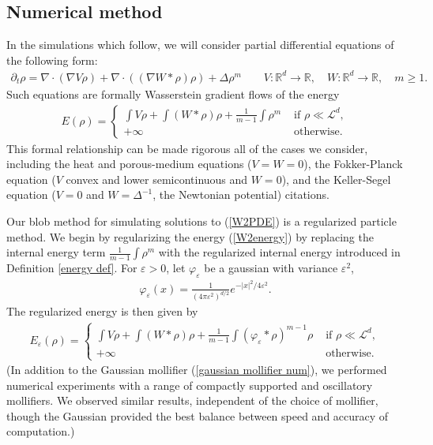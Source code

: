 \documentclass[11pt,leqno]{amsart}
\theoremstyle{definition}
\newcommand{\R}{{\mathord{\mathbb R}}}
\newcommand{\Rd}{{\mathord{\mathbb R}^d}}
\def\epsilon{\varepsilon}
\def\e{\varepsilon}
\begin{document}
\subsection{Numerical method} \label{numericalmethod}
In the simulations which follow, we will consider partial differential equations of the following form:
\begin{align} \label{W2PDE}
\partial_t \rho = \nabla \cdot (\nabla V \rho) + \nabla \cdot ((\nabla W*\rho) \rho) + \Delta \rho^m \qquad V: \Rd \to \R, \quad W: \Rd \to \R , \quad m \geq 1 .
\end{align}
Such equations are formally Wasserstein gradient flows of the energy
\begin{align} \label{W2energy}
E(\rho) = \begin{cases}
 \int V \rho + \int (W*\rho) \rho + \frac{1}{m-1} \int \rho^m &\text{ if } \rho \ll \mathcal{L}^d ,\\ +\infty &\text{ otherwise.}
 \end{cases}
\end{align}
This formal relationship can be made rigorous all of the cases we consider, including the heat and porous-medium equations ($V = W =0$), the Fokker-Planck equation ($V$ convex and lower semicontinuous and $W=0$), and the Keller-Segel equation ($V = 0$ and $W = \Delta^{-1}$, the Newtonian potential) {\color{Aquamarine} citations}.

Our blob method for simulating solutions to (\ref{W2PDE}) is a regularized particle method. We begin by regularizing the energy (\ref{W2energy}) by replacing the internal energy term $\frac{1}{m-1} \int \rho^m$ with the regularized internal energy introduced in Definition \ref{energy def}. For $\epsilon >0$,  let $\varphi_\e$ be a gaussian with variance $\epsilon^2$,
\begin{align} \label{gaussian mollifier num}
\varphi_\e(x) = \frac{1}{(4\pi \epsilon^2)^{d/2}} e^{-|x|^2/4 \epsilon^2}.
\end{align}
The regularized energy is then given by
\begin{align} \label{regW2energy}
E_\epsilon(\rho) = \begin{cases}
 \int V \rho + \int (W*\rho) \rho + \frac{1}{m-1} \int (\varphi_\e *\rho)^{m-1} \rho &\text{ if } \rho \ll \mathcal{L}^d ,\\ +\infty &\text{ otherwise.}
 \end{cases}
\end{align}
(In addition to the Gaussian mollifier (\ref{gaussian mollifier num}), we performed numerical experiments with a range of compactly supported and oscillatory mollifiers. We observed similar results, independent of the choice of mollifier, though the Gaussian provided the best balance between speed and accuracy of computation.)
\end{document}
